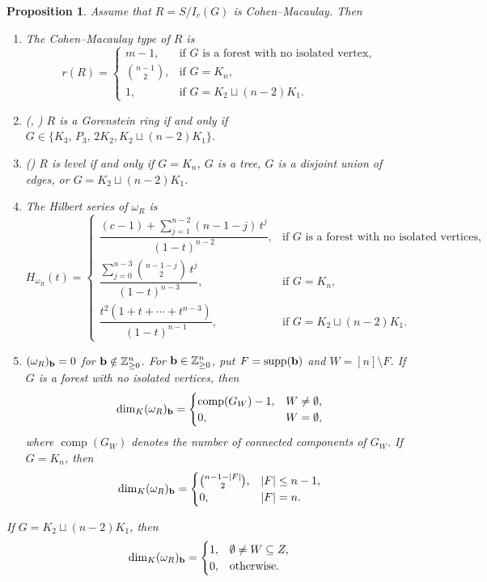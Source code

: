\documentclass[12pt]{amsart}
\newtheorem{Proposition}[Theorem]{Proposition}
\begin{document}
\begin{Proposition}
    \label{cor:canonical-invariants}
Assume that
$R=S/I_c(G)$ is Cohen--Macaulay. Then
\begin{enumerate}
\item[\textup{(a)}] The Cohen--Macaulay type of $R$ is 
\[
r(R)=\begin{cases}
m-1, & \text{if $G$ is a forest with no isolated vertex},\\[1mm]
\binom{n-1}{2}, & \text{if $G=K_n$},\\[1mm]
1, & \text{if $G=K_2\sqcup (n-2)K_1$}.
\end{cases}
\]
\item[\textup{(b)}] \textnormal{(}\cite[Theorem 2.12]{fm2025}, \cite[Corollary 1.6]{hqm2026}\textnormal{)} $R$ is a Gorenstein ring if and only if $G\in\{K_3,\,P_3,\,2K_2, K_2\sqcup (n-2)K_1\}$.
\item[\textup{(c)}] \textnormal{(}\cite[Corollary 3.5]{hqm2026}\textnormal{)} $R$ is level if and only if $G=K_n$, $G$ is a tree,  $G$ is a disjoint union of edges, or  $G=K_2\sqcup (n-2)K_1$.

	\item[(d)] The Hilbert series of $\omega_R$ is
 		\[
 		H_{\omega_R}(t)=
 		\begin{cases}
 			\dfrac{(c-1)+\sum_{j=1}^{n-2}(n-1-j)\,t^{j}}{(1-t)^{n-2}}, & \text{if $G$ is a forest with no isolated vertices},\\[4mm]
 			\dfrac{\sum_{j=0}^{n-3}\binom{n-1-j}{2}\,t^{j}}{(1-t)^{n-3}}, & \text{if } G=K_n,\\[4mm]
         \dfrac{t^2(1+t+\cdots+t^{n-3})}{(1-t)^{n-1}},  & \text{if } G=K_2\sqcup (n-2)K_1.
 		\end{cases}
 		\]
		    
\item[\textup{(e)}] $(\omega_R)_{{\bf b}}=0$ for ${\bf b}\notin\mathbb Z_{\ge0}^n$. For ${\bf b}\in\mathbb Z_{\ge0}^n$, put $F=\operatorname{supp}({\bf b})$
and $W=[n]\setminus F$. If $G$ is a forest with no isolated vertices, then
\[
\dim_K(\omega_R)_{{\bf b}}=\begin{cases}\operatorname{comp}(G_W)-1,& W\neq\emptyset,\\ 0,& W=\emptyset,\end{cases}
\]
where $\operatorname{comp}(G_W)$ denotes the number of connected components of $G_W$. If $G=K_n$, then
\[
\dim_K(\omega_R)_{{\bf b}}=\begin{cases}\binom{n-1-|F|}{2},& |F|\le n-1,\\ 0,& |F|=n.\end{cases}
\]
\end{enumerate}

If $G=K_2\sqcup (n-2)K_1$, then 
\[
\dim_K(\omega_R)_{{\bf b}}=\begin{cases}1,& \emptyset\neq W\subseteq Z,\, \\ 0,& \text{otherwise}.\end{cases}
\]
\end{Proposition}
\end{document}
